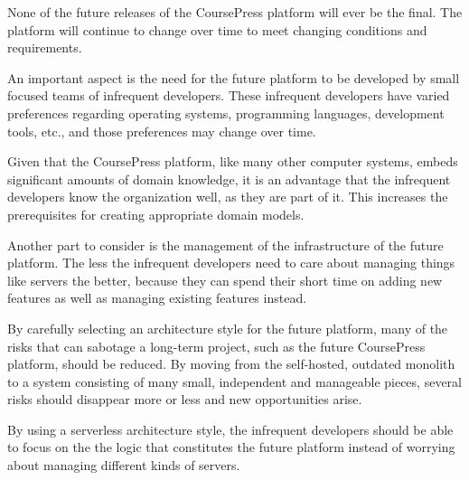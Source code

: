 

None of the future releases of the CoursePress platform will ever be the final. The platform will continue to change over time to meet changing conditions and requirements.

An important aspect is the need for the future platform to be developed by small focused teams of infrequent developers. These infrequent developers have varied preferences regarding operating systems, programming languages, development tools, etc., and those preferences may change over time.

Given that the CoursePress platform, like many other computer systems, embeds significant amounts of domain knowledge, it is an advantage that the infrequent developers know the organization well, as they are part of it. This increases the prerequisites for creating appropriate domain models.\cite{OffenDomainDevelopment}

Another part to consider is the management of the infrastructure of the future platform. The less the infrequent developers need to care about managing things like servers the better, because they can spend their short time on adding new features as well as managing existing features instead.

By carefully selecting an architecture style for the future platform, many of the risks that can sabotage a long-term project, such as the future CoursePress platform, should be reduced. By moving from the self-hosted, outdated monolith to a system consisting of many small, independent and manageable pieces, several risks should disappear more or less and new opportunities arise.


By using a serverless architecture style, the infrequent developers should be able to focus on the the logic that constitutes the future platform instead of worrying about managing different kinds of servers.\cite{?}


